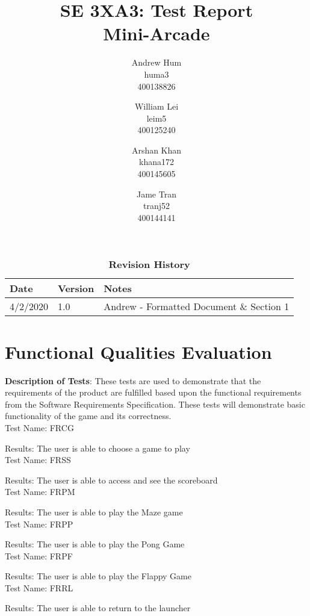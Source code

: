 \documentclass[12pt, titlepage]{article}
\title{SE 3XA3: Test Report\\Mini-Arcade}
\author{Andrew Hum \\ huma3 \\ 400138826 \and
		William Lei \\ leim5 \\ 400125240 \and
		Arshan Khan \\ khana172 \\ 400145605 \and
		Jame Tran \\ tranj52 \\ 400144141
}
\date{}
\begin{document}
\maketitle
\newpage
\tableofcontents
\listoftables
\listoffigures

\begin{table}[!hbp]
\caption{\bf Revision History}
\begin{tabularx}{\textwidth}{p{3cm}p{2cm}X}
\toprule {\bf Date} & {\bf Version} & {\bf Notes} \\
\midrule
4/2/2020 & 1.0 & Andrew - Formatted Document \& Section 1 \\
\bottomrule
\end{tabularx}
\end{table}

\newpage

\section{Functional Qualities Evaluation}

\textbf{Description of Tests}: These tests are used to demonstrate that the requirements of the product are fulfilled based upon the functional requirements from the Software Requirements Specification. These tests will demonstrate basic functionality of the game and its correctness. \\
	
	
	Test Name: FRCG
	
	Results: The user is able to choose a game to play \\
	
	Test Name: FRSS
	
	Results: The user is able to access and see the scoreboard \\ 
	
	Test Name: FRPM 
	
	Results: The user is able to play the Maze game \\ 
	
	Test Name: FRPP 
	
	Results: The user is able to play the Pong Game \\ 
	
	Test Name: FRPF
	
	Results: The user is able to play the Flappy Game \\
	
	Test Name: FRRL
	
	Results: The user is able to return to the launcher \\
	
\end{document}
